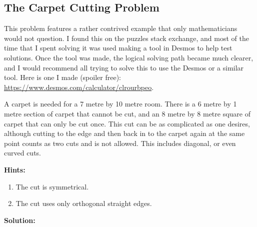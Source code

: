 
\subsection{The Carpet Cutting Problem}

This problem features a rather contrived example that only mathematicians would not question. I found this on the puzzles stack exchange, and most of the time that I spent solving it was used making a tool in Desmos to help test solutions. Once the tool was made, the logical solving path became much clearer, and I would recommend all trying to solve this to use the Desmos or a similar tool. Here is one I made (spoiler free): \url{https://www.desmos.com/calculator/clrourbpeo}.

A carpet is needed for a 7 metre by 10 metre room. There is a 6 metre by 1 metre section of carpet that cannot be cut, and an 8 metre by 8 metre square of carpet that can only be cut once. This cut can be as complicated as one desires, although cutting to the edge and then back in to the carpet again at the same point counts as two cuts and is not allowed. This includes diagonal, or even curved cuts.

\textbf{Hints:}

\begin{enumerate}
    \item The cut is symmetrical.
    \item The cut uses only orthogonal straight edges.
\end{enumerate}

\textbf{Solution:}


